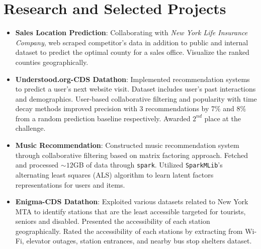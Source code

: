 \documentclass[letterpaper,11pt]{article}
\newcommand{\resumeItem}[2]{
  \item\small{
    \textbf{#1}{: #2 \vspace{-2pt}}
  }
}
\newcommand{\resumeSubHeadingListStart}{\begin{itemize}[leftmargin=*]}
\newcommand{\resumeSubHeadingListEnd}{\end{itemize}}
\begin{document}
 
 

\section{Research and Selected Projects}
\resumeSubHeadingListStart

\resumeItem{Sales Location Prediction}{Collaborating with \textit{New York Life Insurance Company}, web scraped competitor's data in addition to public and internal dataset to predict the optimal county for a sales office. Visualize the ranked counties geographically.}   

\resumeItem{Understood.org-CDS Datathon}{Implemented recommendation systems to predict a user's next website visit. Dataset includes user's past interactions and demographics. User-based collaborative filtering and popularity with time decay methods improved precision with 3 recommendations by 7\% and 8\% from a random prediction baseline respectively. Awarded $2^{nd}$ place at the challenge.}



\resumeItem{Music Recommendation}
      {Constructed music recommendation system through collaborative filtering based on matrix factoring approach. Fetched and processed ${\sim} 12$GB of data through \texttt{spark}. Utilized \texttt{SparkMLib}'s alternating least squares (ALS) algorithm to learn latent factors representations for users and items.}
      
\resumeItem{Enigma-CDS Datathon}
      {Exploited various datasets related to New York MTA to identify stations that are the least accessible targeted for tourists, seniors and disabled. Presented the accessibility of each station geographically. Rated the accessibility of each stations by extracting from Wi-Fi, elevator outages, station entrances, and nearby bus stop shelters dataset.}
      
   

\resumeSubHeadingListEnd
\end{document}
